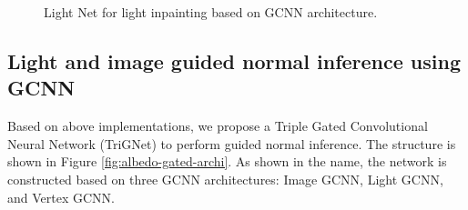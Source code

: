 \documentclass[]{article}
\begin{document}
\begin{figure}[th]

\caption{Light Net for light inpainting based on GCNN architecture.}
\label{fig:light-net-archi}
\end{figure}


\subsection{Light and image guided normal inference using GCNN}
Based on above implementations, we propose a Triple Gated Convolutional Neural Network (TriGNet) to perform guided normal inference. The structure is shown in Figure \ref{fig:albedo-gated-archi}. As shown in the name, the network is constructed based on three GCNN architectures: Image GCNN, Light GCNN, and Vertex GCNN.
\end{document}
